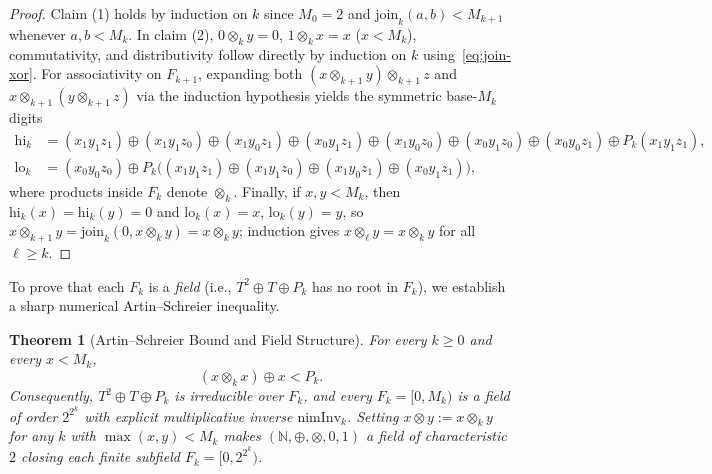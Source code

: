 \documentclass[11pt]{article}
\newtheorem{theorem}{Theorem}[section]
\theoremstyle{definition}
\theoremstyle{remark}
\newcommand{\nimadd}{\oplus}
\newcommand{\nimmul}{\otimes}
\newcommand{\N}{\mathbb{N}}
\begin{document}
\begin{proof}
Claim (1) holds by induction on $k$ since $M_0 = 2$ and $\mathrm{join}_k(a,b) < M_{k+1}$ whenever $a, b < M_k$. In claim (2), $0 \nimmul_k y = 0$, $1 \nimmul_k x = x$ ($x < M_k$), commutativity, and distributivity follow directly by induction on $k$ using~\eqref{eq:join-xor}. For associativity on $F_{k+1}$, expanding both $(x \nimmul_{k+1} y) \nimmul_{k+1} z$ and $x \nimmul_{k+1} (y \nimmul_{k+1} z)$ via the induction hypothesis yields the symmetric base-$M_k$ digits
\begin{align*}
  \mathrm{hi}_k &= (x_1 y_1 z_1) \nimadd (x_1 y_1 z_0) \nimadd (x_1 y_0 z_1) \nimadd (x_0 y_1 z_1) \nimadd (x_1 y_0 z_0) \nimadd (x_0 y_1 z_0) \nimadd (x_0 y_0 z_1) \nimadd P_k(x_1 y_1 z_1),\\
  \mathrm{lo}_k &= (x_0 y_0 z_0) \nimadd P_k\bigl((x_1 y_1 z_1) \nimadd (x_1 y_1 z_0) \nimadd (x_1 y_0 z_1) \nimadd (x_0 y_1 z_1)\bigr),
\end{align*}
where products inside $F_k$ denote $\nimmul_k$. Finally, if $x, y < M_k$, then $\mathrm{hi}_k(x) = \mathrm{hi}_k(y) = 0$ and $\mathrm{lo}_k(x) = x$, $\mathrm{lo}_k(y) = y$, so $x \nimmul_{k+1} y = \mathrm{join}_k(0, x \nimmul_k y) = x \nimmul_k y$; induction gives $x \nimmul_\ell y = x \nimmul_k y$ for all $\ell \ge k$.
\end{proof}

To prove that each $F_k$ is a \emph{field} (i.e., $T^2 \nimadd T \nimadd P_k$ has no root in $F_k$), we establish a sharp numerical Artin--Schreier inequality.

\begin{theorem}[Artin--Schreier Bound and Field Structure]\label{thm:field}
For every $k \ge 0$ and every $x < M_k$,
\begin{equation}\label{eq:AS-bound}
  (x \nimmul_k x) \nimadd x < P_k.
\end{equation}
Consequently, $T^2 \nimadd T \nimadd P_k$ is irreducible over $F_k$, and every $F_k = [0, M_k)$ is a field of order $2^{2^k}$ with explicit multiplicative inverse $\mathrm{nimInv}_k$. Setting $x \nimmul y := x \nimmul_k y$ for any $k$ with $\max(x,y) < M_k$ makes $(\N, \nimadd, \nimmul, 0, 1)$ a field of characteristic $2$ closing each finite subfield $F_k = [0, 2^{2^k})$.
\end{theorem}
\end{document}
